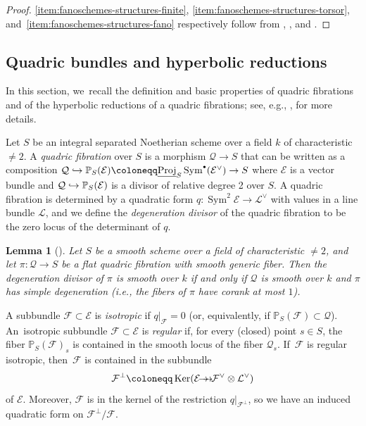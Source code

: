 \documentclass[JEP,XML,SOM,Unicode,NoEqCountersInSection,published]{cedram}
\newcommand\hto{\mathrel{\lhook\joinrel\to}}
\newcommand{\onto}{\mathchoice{\to\hspace*{-5mm}\to}{\to\hspace*{-2.85mm}\to}{\to\hspace*{-3mm}\to}{\to\hspace*{-3mm}\to}}
\newcommand{\sbullet}{{\scriptscriptstyle\bullet}}
\newcommand{\csbullet}{{\raisebox{1pt}{$\sbullet$}}}
\let\cal\mathcal
\let\bb\mathbb\let\Bbb\mathbb
\theoremstyle{plain}
\newtheorem{lem}[thm]{Lemma}
\theoremstyle{definition}
\DeclareMathOperator\Ker{Ker}
\DeclareMathOperator{\Proj}{Proj}
\DeclareMathOperator{\Sym}{Sym}
\newcommand{\defi}[1]{\emph{#1}}
\begin{document}
\begin{proof}
\eqref{item:fanoschemes-structures-finite}, \eqref{item:fanoschemes-structures-torsor}, and~\eqref{item:fanoschemes-structures-fano} respectively follow from
\cite[\S 6]{BG14},
\cite[Th.\,1.1]{Wang-maximal-linear-spaces}, and \cite[Rem.\,3.2]{DebarreManivel98}.
\end{proof}

\subsection{Quadric bundles and hyperbolic reductions}\label{subsection:hyperbolic-reduction}

In this section, we~recall the definition and basic properties of quadric fibrations and of the hyperbolic reductions of a quadric fibrations; see, e.g., \cite[\S 2]{Kuznetsov-hyperbolic}, \cite[\S 1.3]{ABB14} for more details.

Let \(S\) be an integral separated Noetherian scheme over a field \(k\) of characteristic \(\neq 2\). A \defi{quadric fibration} over \(S\) is a morphism \(\cal Q\to S\) that can be written as a composition \(\cal Q\hto\bb P_S(\cal E) \coloneqq \underline{\Proj}_S \Sym^\csbullet (\cal E^\vee) \to S\)
where \(\cal E\) is a vector bundle and \(\cal Q\hto\bb P_S(\cal E)\) is a divisor of relative degree 2 over \(S\). A quadric fibration is determined by a quadratic form \(q\colon\Sym^2\cal E\to\cal L^\vee\) with values in a line bundle \(\cal L\), and we define the \defi{degeneration divisor} of the quadric fibration to be the zero locus of the determinant of $q$.

\begin{lem}[{\cite[Prop.\,1.2.5]{ABB14}}]\label{lem:quadric-bundle-simple-degeneration}
Let \(S\) be a smooth scheme over a field of characteristic \(\neq 2\), and let \(\pi\colon\cal Q\to S\) be a flat quadric fibration with smooth generic fiber. Then the degeneration divisor of \(\pi\) is smooth over \(k\) if and only if \(\cal Q\) is smooth over \(k\) and \(\pi\) has simple degeneration (i.e., the fibers of \(\pi\) have corank at most $1$).
\end{lem}

A subbundle \(\cal F\subset \cal E\) is \defi{isotropic} if \(q|_{\cal F}=0\) (or, equivalently, if \(\bb P_S(\cal F)\subset\cal Q\)). An~isotropic subbundle \(\cal F\subset\cal E\) is \defi{regular} if, for every (closed) point \(s\in S\), the fiber \(\bb P_S(\cal F)_s\) is contained in the smooth locus of the fiber \(\cal Q_s\). If~\(\cal F\) is regular isotropic, then~\(\cal F\) is contained in the subbundle\vspace*{-3pt}\enlargethispage{.5\baselineskip}
\[
\cal F^\perp\coloneqq\Ker(\cal E\onto\cal F^\vee\otimes\cal L^\vee)
\]
of \(\cal E\). Moreover, \(\cal F\) is in the kernel of the restriction \(q|_{\cal F^\perp}\), so we have an induced quadratic form on \(\cal F^\perp/\cal F\).
\end{document}
